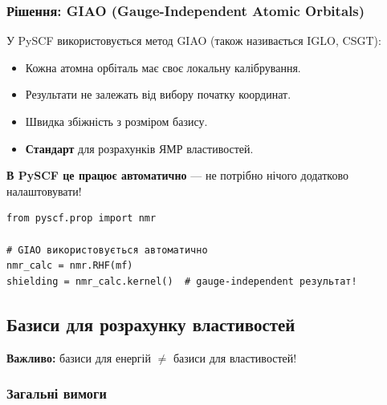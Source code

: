 \subsubsection*{Рішення: GIAO (Gauge-Independent Atomic Orbitals)}

У PySCF використовується метод GIAO (також називається IGLO, CSGT):

\begin{itemize}
    \item Кожна атомна орбіталь має своє локальну калібрування.
    \item Результати не залежать від вибору початку координат.
    \item Швидка збіжність з розміром базису.
    \item \textbf{Стандарт} для розрахунків ЯМР властивостей.
\end{itemize}

\textbf{В PySCF це працює автоматично} --- не потрібно нічого додатково налаштовувати!

\begin{verbatim}
from pyscf.prop import nmr

# GIAO використовується автоматично
nmr_calc = nmr.RHF(mf)
shielding = nmr_calc.kernel()  # gauge-independent результат!
\end{verbatim}

\subsection*{Базиси для розрахунку властивостей}

\textbf{Важливо:} базиси для енергій $\neq$ базиси для властивостей!

\subsubsection*{Загальні вимоги}

